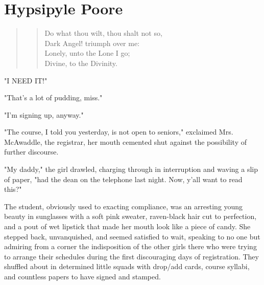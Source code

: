 \chapter{Hypsipyle Poore}

\begin{quotation}
\begin{verse}
  \hspace{-1.8em} Do what thou wilt, thou shalt not so, \\
  Dark Angel! triumph over me:  \\
  Lonely, unto the Lone I go;   \\
  Divine, to the Divinity.
\end{verse}
\end{quotation}
\vspace{0.2cm}
 
 
  "I NEED IT!"

  "That's a lot of pudding, miss."

  "I'm signing up, anyway."

  "The course, I told you yesterday, is not open to seniors," exclaimed Mrs.
McAwaddle, the registrar, her mouth cemented shut against the possibility of
further discourse.

  "My daddy," the girl drawled, 
charging through in interruption and waving a
slip of paper, "had the dean on the telephone last night. Now, y'all want to
read this?"

  The student, obviously used to exacting compliance, was an arresting young
beauty in sunglasses with a soft pink sweater, raven-black hair cut to
perfection, and a pout 
of wet lipstick that made her mouth look like a piece of
candy. She stepped back, unvanquished, 
and seemed satisfied to wait, speaking to 
no one but admiring from a corner the indisposition 
of the other girls there who
were trying to arrange their schedules during the first discouraging days of
registration. They shuffled about in determined little squads with drop/add
cards, course syllabi, and countless papers to have signed and stamped.

